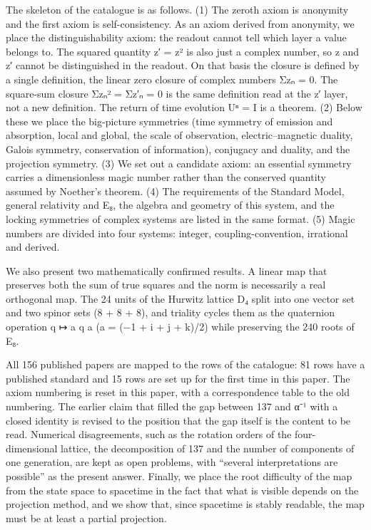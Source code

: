 \documentclass[
  a4paper,
]{article}
\begin{document}
The skeleton of the catalogue is as follows. (1) The zeroth axiom is
anonymity and the first axiom is self-consistency. As an axiom derived
from anonymity, we place the distinguishability axiom: the readout
cannot tell which layer a value belongs to. The squared quantity z′ = z²
is also just a complex number, so z and z′ cannot be distinguished in
the readout. On that basis the closure is defined by a single
definition, the linear zero closure of complex numbers Σzₙ = 0. The
square-sum closure Σzₙ² = Σz′ₙ = 0 is the same definition read at the z′
layer, not a new definition. The return of time evolution Uⁿ = I is a
theorem. (2) Below these we place the big-picture symmetries (time
symmetry of emission and absorption, local and global, the scale of
observation, electric--magnetic duality, Galois symmetry, conservation
of information), conjugacy and duality, and the projection symmetry. (3)
We set out a candidate axiom: an essential symmetry carries a
dimensionless magic number rather than the conserved quantity assumed by
Noether's theorem. (4) The requirements of the Standard Model, general
relativity and E₈, the algebra and geometry of this system, and the
locking symmetries of complex systems are listed in the same format. (5)
Magic numbers are divided into four systems: integer,
coupling-convention, irrational and derived.

We also present two mathematically confirmed results. A linear map that
preserves both the sum of true squares and the norm is necessarily a
real orthogonal map. The 24 units of the Hurwitz lattice D₄ split into
one vector set and two spinor sets (8 + 8 + 8), and triality cycles them
as the quaternion operation q ↦ a q a (a = (−1 + i + j + k)/2) while
preserving the 240 roots of E₈.

All 156 published papers are mapped to the rows of the catalogue: 81
rows have a published standard and 15 rows are set up for the first time
in this paper. The axiom numbering is reset in this paper, with a
correspondence table to the old numbering. The earlier claim that filled
the gap between 137 and α⁻¹ with a closed identity is revised to the
position that the gap itself is the content to be read. Numerical
disagreements, such as the rotation orders of the four-dimensional
lattice, the decomposition of 137 and the number of components of one
generation, are kept as open problems, with ``several interpretations
are possible'' as the present answer. Finally, we place the root
difficulty of the map from the state space to spacetime in the fact that
what is visible depends on the projection method, and we show that,
since spacetime is stably readable, the map must be at least a partial
projection.
\end{document}
